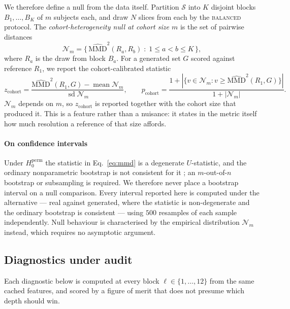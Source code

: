 \documentclass[preprint,12pt,authoryear]{elsarticle}
\newcommand{\mmd}{\mathrm{MMD}}
\begin{document}
We therefore define a null from the data itself. Partition $\mathcal{S}$ into
$K$ disjoint blocks $B_1, \dots, B_K$ of $m$ subjects each, and draw $N$ slices
from each by the \textsc{balanced} protocol. The
\emph{cohort-heterogeneity null at cohort size $m$} is the set of pairwise
distances
\begin{equation}
\mathcal{N}_m = \big\{\, \widehat{\mmd}^2(R_a, R_b) \;:\; 1 \le a < b \le K \,\big\},
\label{eq:null}
\end{equation}
where $R_a$ is the draw from block $B_a$. For a generated set $G$ scored
against reference $R_1$, we report the cohort-calibrated statistic
\begin{equation}
z_{\mathrm{cohort}} =
  \frac{\widehat{\mmd}^2(R_1, G) - \operatorname{mean}\mathcal{N}_m}
       {\operatorname{sd}\mathcal{N}_m},
\qquad
p_{\mathrm{cohort}} = \frac{1 + |\{v \in \mathcal{N}_m : v \ge \widehat{\mmd}^2(R_1,G)\}|}
                           {1 + |\mathcal{N}_m|}.
\label{eq:cohortz}
\end{equation}
$\mathcal{N}_m$ depends on $m$, so $z_{\mathrm{cohort}}$ is reported together
with the cohort size that produced it. This is a feature rather than a
nuisance: it states in the metric itself how much resolution a reference of that
size affords.

\paragraph{On confidence intervals}
Under $H_0^{\mathrm{perm}}$ the statistic in Eq.~\eqref{eq:mmd} is a degenerate
$U$-statistic, and the ordinary nonparametric bootstrap is not consistent for
it \citep{arcones1992bootstrap}; an $m$-out-of-$n$ bootstrap or subsampling is
required. We therefore never place a bootstrap interval on a null comparison.
Every interval reported here is computed under the alternative --- real against
generated, where the statistic is non-degenerate and the ordinary bootstrap is
consistent --- using $500$ resamples of each sample independently. Null
behaviour is characterised by the empirical distribution $\mathcal{N}_m$
instead, which requires no asymptotic argument.

\subsection{Diagnostics under audit}
\label{sec:diagnostics}

Each diagnostic below is computed at every block $\ell \in \{1,\dots,12\}$ from
the same cached features, and scored by a figure of merit that does not presume
which depth should win.
\end{document}
